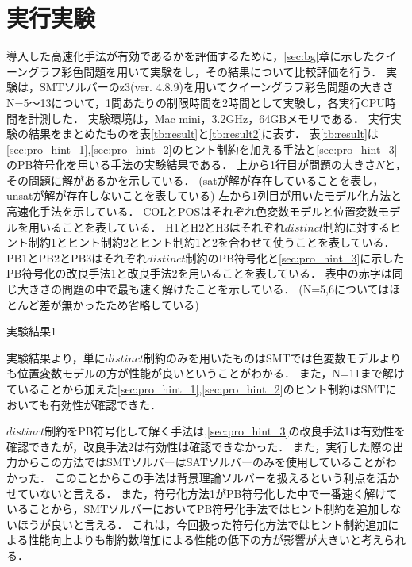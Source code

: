 \chapter{実行実験}\label{sec:exp}

導入した高速化手法が有効であるかを評価するために，\ref{sec:bg}章に示したクイーングラフ彩色問題を用いて実験をし，その結果について比較評価を行う．
実験は，SMTソルバーのz3(ver. 4.8.9)を用いてクイーングラフ彩色問題の大きさN=5〜13について，1問あたりの制限時間を2時間として実験し，各実行CPU時間を計測した．
実験環境は，Mac mini，3.2GHz，64GBメモリである．
実行実験の結果をまとめたものを表\ref{tb:result}と\ref{tb:result2}に表す．
表\ref{tb:result}は\ref{sec:pro_hint_1},\ref{sec:pro_hint_2}のヒント制約を加える手法と\ref{sec:pro_hint_3}のPB符号化を用いる手法の実験結果である．
上から1行目が問題の大きさ$N$と，その問題に解があるかを示している．
(satが解が存在していることを表し，unsatが解が存在しないことを表している)
左から1列目が用いたモデル化方法と高速化手法を示している．
COLとPOSはそれぞれ色変数モデルと位置変数モデルを用いることを表している．
H1とH2とH3はそれぞれ$distinct$制約に対するヒント制約1とヒント制約2とヒント制約1と2を合わせて使うことを表している．
PB1とPB2とPB3はそれぞれ$distinct$制約のPB符号化と\ref{sec:pro_hint_3}に示したPB符号化の改良手法1と改良手法2を用いることを表している．
表中の赤字は同じ大きさの問題の中で最も速く解けたことを示している．
(N=5,6についてはほとんど差が無かったため省略している)

\begin{table}[htb]
    \caption{実験結果1}
{\tiny \label{tb:result}}
\end{table}

実験結果より，単に$distinct$制約のみを用いたものはSMTでは色変数モデルよりも位置変数モデルの方が性能が良いということがわかる．
また，N=11まで解けていることから加えた\ref{sec:pro_hint_1},\ref{sec:pro_hint_2}のヒント制約はSMTにおいても有効性が確認できた．

$distinct$制約をPB符号化して解く手法は,\ref{sec:pro_hint_3}の改良手法1は有効性を確認できたが，改良手法2は有効性は確認できなかった．
また，実行した際の出力からこの方法ではSMTソルバーはSATソルバーのみを使用していることがわかった．
このことからこの手法は背景理論ソルバーを扱えるという利点を活かせていないと言える．
また，符号化方法1がPB符号化した中で一番速く解けていることから，SMTソルバーにおいてPB符号化手法ではヒント制約を追加しないほうが良いと言える．
これは，今回扱った符号化方法ではヒント制約追加による性能向上よりも制約数増加による性能の低下の方が影響が大きいと考えられる．

